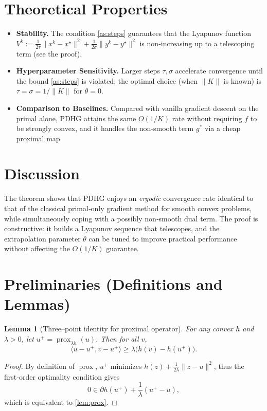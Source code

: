 \documentclass{article}
\newtheorem{lemma}{Lemma}
\newcommand{\prox}{\operatorname{prox}}
\begin{document}
\section*{Theoretical Properties}
\begin{itemize}
    \item \textbf{Stability.} The condition \eqref{as:steps} guarantees that the Lyapunov function  
    $V^{k}:=\frac{1}{2\tau}\|x^{k}-x^{\star}\|^{2}+\frac{1}{2\sigma}\|y^{k}-y^{\star}\|^{2}$  
    is non‑increasing up to a telescoping term (see the proof).
    \item \textbf{Hyperparameter Sensitivity.} Larger steps $\tau,\sigma$ accelerate convergence until the bound \eqref{as:steps} is violated; the optimal choice (when $\|K\|$ is known) is $\tau=\sigma=1/\|K\|$ for $\theta=0$.
    \item \textbf{Comparison to Baselines.} Compared with vanilla gradient descent on the primal alone, PDHG attains the same $O(1/K)$ rate without requiring $f$ to be strongly convex, and it handles the non‑smooth term $g^{*}$ via a cheap proximal map.
\end{itemize}

\section*{Discussion}
The theorem shows that PDHG enjoys an \emph{ergodic} convergence rate identical to that of the classical primal‑only gradient method for smooth convex problems, while simultaneously coping with a possibly non‑smooth dual term. The proof is constructive: it builds a Lyapunov sequence that telescopes, and the extrapolation parameter $\theta$ can be tuned to improve practical performance without affecting the $O(1/K)$ guarantee.

\newpage
\section*{Preliminaries (Definitions and Lemmas)}
\begin{lemma}[Three–point identity for proximal operator]\label{lem:prox}
For any convex $h$ and $\lambda>0$, let $u^{+}=\prox_{\lambda h}(u)$. Then for all $v$,
\[
\langle u-u^{+},v-u^{+}\rangle \ge \lambda\bigl(h(v)-h(u^{+})\bigr).
\tag{7}
\]
\end{lemma}
\begin{proof}
By definition of $\prox$, $u^{+}$ minimizes $h(z)+\frac{1}{2\lambda}\|z-u\|^{2}$, thus the first‑order optimality condition gives
\[
0\in \partial h(u^{+})+\frac{1}{\lambda}(u^{+}-u),
\]
which is equivalent to \eqref{lem:prox}. \hfill\qedsymbol
\end{proof}
\end{document}

